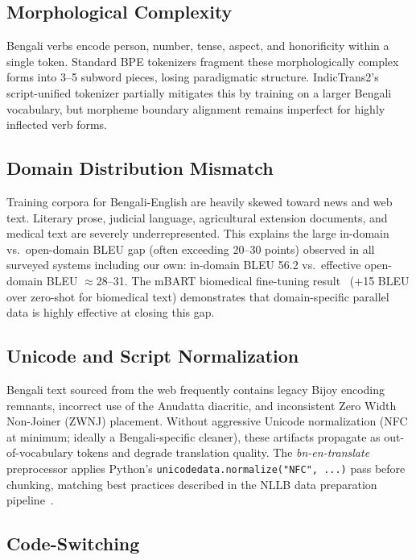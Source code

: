 \documentclass[conference]{IEEEtran}
\begin{document}
\subsection{Morphological Complexity}

Bengali verbs encode person, number, tense, aspect, and honorificity
within a single token.
Standard BPE tokenizers fragment these morphologically complex forms
into 3--5 subword pieces, losing paradigmatic structure.
IndicTrans2's script-unified tokenizer partially mitigates this by
training on a larger Bengali vocabulary, but morpheme boundary alignment
remains imperfect for highly inflected verb forms.

\subsection{Domain Distribution Mismatch}

Training corpora for Bengali-English are heavily skewed toward news and
web text.
Literary prose, judicial language, agricultural extension documents,
and medical text are severely underrepresented.
This explains the large in-domain vs.\ open-domain BLEU gap (often
exceeding 20--30 points) observed in all surveyed systems including
our own: in-domain BLEU 56.2 vs.\ effective open-domain BLEU
$\approx$28--31.
The mBART biomedical fine-tuning result~\cite{hasan2020low} (+15 BLEU
over zero-shot for biomedical text) demonstrates that domain-specific
parallel data is highly effective at closing this gap.

\subsection{Unicode and Script Normalization}

Bengali text sourced from the web frequently contains legacy Bijoy
encoding remnants, incorrect use of the Anudatta diacritic, and
inconsistent Zero Width Non-Joiner (ZWNJ) placement.
Without aggressive Unicode normalization (NFC at minimum; ideally
a Bengali-specific cleaner), these artifacts propagate as out-of-vocabulary
tokens and degrade translation quality.
The \textit{bn-en-translate} preprocessor applies Python's
\texttt{unicodedata.normalize("NFC", ...)} pass before chunking, matching
best practices described in the NLLB data preparation pipeline~\cite{nllb2022}.

\subsection{Code-Switching}
\end{document}
